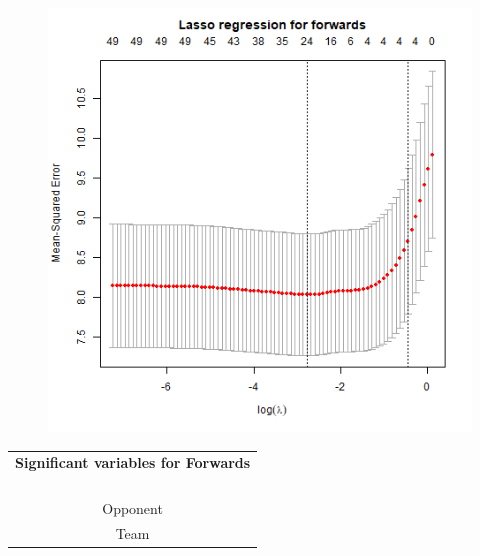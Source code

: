 \begin{table}[H]
\centering
\begin{minipage}{.5\textwidth}
  \centering
  \captionsetup{justification=centering}
    \begin{figure}[H]
        \centering
        \includegraphics[scale=0.4]{fig/chapter_6/lasso_FWD.png}
    \end{figure}
    \label{fig:lasso_FWD_1}
\end{minipage}%
\begin{minipage}{.5\textwidth}
  \centering
  \captionsetup{justification=centering}
    \begin{tabular}{c}
    \textbf{Significant variables for Forwards}\\
\\
\\    
\\
\\
Opponent                              \\
Team                                  \\

\end{tabular}
\end{minipage}
\end{table}
